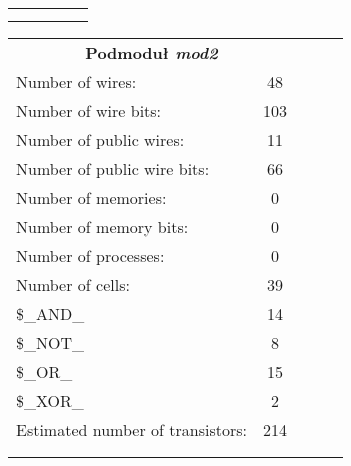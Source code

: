 \begin{table}[!htb]
\begin{minipage}{0.55\linewidth}
\begin{tabular}{lllll}
			&  &  &  &  \\
			&  &  &  & 
		\end{tabular}
	\end{minipage}%
	\begin{minipage}{0.55\linewidth}
		\centering
		\begin{tabular}{lllll}
			\cline{1-2}
			\multicolumn{2}{|c|}{\textbf{Podmoduł \emph{mod2}}} &  &  &  \\ \cline{1-2}
			\multicolumn{1}{|l|}{Number of wires:} & \multicolumn{1}{c|}{48} &  &  &  \\ \cline{1-2}
			\multicolumn{1}{|l|}{Number of wire bits:} & \multicolumn{1}{c|}{103} &  &  &  \\ \cline{1-2}
			\multicolumn{1}{|l|}{Number of public wires:} & \multicolumn{1}{c|}{11} &  &  &  \\ \cline{1-2}
			\multicolumn{1}{|l|}{Number of public wire bits:} & \multicolumn{1}{c|}{66} &  &  &  \\ \cline{1-2}
			\multicolumn{1}{|l|}{Number of memories:} & \multicolumn{1}{c|}{0} &  &  &  \\ \cline{1-2}
			\multicolumn{1}{|l|}{Number of memory bits: } & \multicolumn{1}{c|}{0} &  &  &  \\ \cline{1-2}
			\multicolumn{1}{|l|}{Number of processes: } & \multicolumn{1}{c|}{0} &  &  &  \\ \cline{1-2}
			\multicolumn{1}{|l|}{Number of cells:} & \multicolumn{1}{c|}{39} &  &  &  \\ \cline{1-2}
			\multicolumn{1}{|l|}{\$\_AND\_} & \multicolumn{1}{c|}{14} &  &  &  \\ \cline{1-2}
			\multicolumn{1}{|l|}{\$\_NOT\_} & \multicolumn{1}{c|}{8} &  &  &  \\ \cline{1-2}
			\multicolumn{1}{|l|}{\$\_OR\_} & \multicolumn{1}{c|}{15} &  &  &  \\ \cline{1-2}
			\multicolumn{1}{|l|}{\$\_XOR\_} & \multicolumn{1}{c|}{2} &  &  &  \\ \cline{1-2}
			\multicolumn{1}{|l|}{Estimated number of transistors:} & \multicolumn{1}{c|}{214} &  &  &  \\ \cline{1-2}
			
			&  &  &  &  \\
			&  &  &  & 
		\end{tabular}
	\end{minipage} 
\end{table}

\newpage

